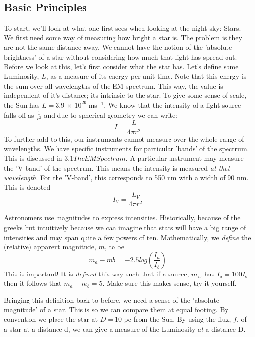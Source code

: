 \subsection{Basic Principles}
To start, we'll look at what one first sees when looking at the night sky: Stars. We first need some way of measuring how bright a star is. The problem is they are not the same distance away. We cannot have the notion of the 'absolute brightness' of a star without considering how much that light has spread out. Before we look at this, let's first consider what the star has. Let's define some Luminosity, $L$, as a measure of its energy per unit time. Note that this energy is the sum over all wavelengths of the EM spectrum. This way, the value is independent of it's distance; its intrinsic to the star. To give some sense of scale, the Sun has $L=3.9$ $\times$ $10^{26}$ ms${}^{-1}$. We know that the intensity of a light source falls off as $\frac{1}{r^{2}}$ and due to spherical geometry we can write:
\begin{equation}
I = \frac{L}{4\pi r^{2}}
\end{equation}
To further add to this, our instruments cannot measure over the whole range of wavelengths. We have specific instruments for particular 'bands' of the spectrum. This is discussed in $3.1 The EM Spectrum$. A particular instrument may measure the 'V-band' of the spectrum. This means the intensity is measured \textit{at that wavelength}. For the 'V-band', this corresponds to 550 nm with a width of 90 nm. This is denoted
\begin{equation}
I_{V} = \frac{L_{V}}{4 \pi r^{2}}
\end{equation}
\par
Astronomers use magnitudes to express intensities. Historically, because of the greeks but intuitively because we can imagine that stars will have a big range of intensities and may span quite a few powers of ten. Mathematically, we \textit{define} the (relative) apparent magnitude, $m$, to be
\begin{equation}
m_{a} - m{b} = -2.5log(\frac{I_{a}}{I_{b}})
\end{equation}
This is important! It is \textit{defined} this way such that if a source, $m_{a}$, has $I_{a} = 100I_{b}$ then it follows that $m_{a} - m_{b} = 5$. Make sure this makes sense, try it yourself. \par
Bringing this definition back to before, we need a sense of the 'absolute magnitude' of a star. This is so we can compare them at equal footing. By convention we place the star at $D=10$ pc from the Sun. By using the flux, $f$, of a star at a distance d, we can give a measure of the Luminosity \textit{at} a distance D. 
